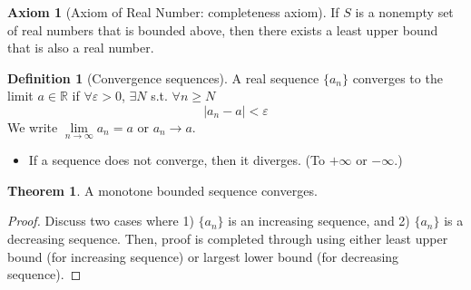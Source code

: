 \documentclass[12pt]{article}
\newcommand{\R}{{\mathbb R}}
\theoremstyle{definition}
\newtheorem{THM}{Theorem}
\newtheorem{axiom}[theorem]{Axiom}
\newtheorem{definition}[theorem]{Definition}
\theoremstyle{plain}
\begin{document}
\begin{axiom}
    [Axiom of Real Number: completeness axiom]
    If $S$ is a nonempty set of real numbers that is bounded above, then there 
    exists a least upper bound that is also a real number.
\end{axiom}

\begin{definition}
    [Convergence sequences]
    A real sequence $\{a_n\}$ converges to the limit $a\in \R$ if $\forall 
    \varepsilon > 0$, $\exists N$ s.t. $\forall n \ge N$
    \[
        |a_n - a| < \varepsilon
    \]
    We write $\underset{n\to\infty} \lim a_n = a$ or $a_n \to a$.
\end{definition}

\begin{itemize}
    \item If a sequence does not converge, then it diverges. (To $+\infty$ or 
        $-\infty$.)
\end{itemize}

\begin{THM}
    A monotone bounded sequence converges.
    \begin{proof}
        Discuss two cases where 1) $\{a_n\}$ is an increasing sequence, and 2) $\{a_n\}$ 
        is a decreasing sequence. Then, proof is completed through using either 
        least upper bound (for increasing sequence) or largest lower bound (for 
        decreasing sequence).
    \end{proof}
\end{THM}
\end{document}

